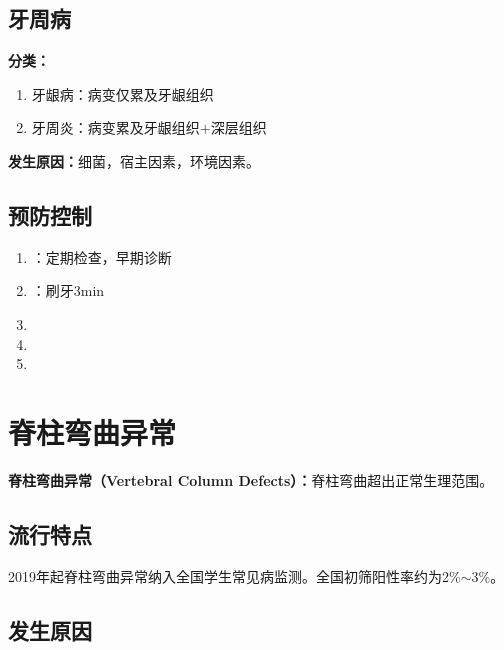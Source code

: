 \subsection{牙周病}

\begin{defbox}
\textbf{分类：}
\begin{enumerate}[leftmargin=*]
    \item 牙龈病：病变仅累及牙龈组织
    \item 牙周炎：病变累及牙龈组织$+$深层组织
\end{enumerate}

\textbf{发生原因：}细菌，宿主因素，环境因素。
\end{defbox}

\subsection{预防控制}

\begin{keybox}
\begin{enumerate}[leftmargin=*]
    \item {}：定期检查，早期诊断
    \item {}：刷牙3min
    \item {}
    \item {}
    \item {}
\end{enumerate}
\end{keybox}

\section{脊柱弯曲异常}

\begin{defbox}
\textbf{脊柱弯曲异常（Vertebral Column Defects）：}脊柱弯曲超出正常生理范围。
\end{defbox}

\subsection{流行特点}

\begin{keybox}
2019年起脊柱弯曲异常纳入全国学生常见病监测。全国初筛阳性率约为2\%$\sim$3\%。
\end{keybox}

\subsection{发生原因}

